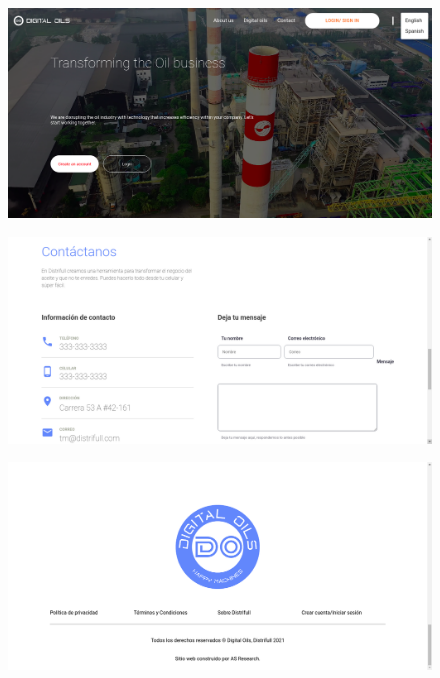 \begin{figure}[!]
	\centering
	\includegraphics[width=1\linewidth, height=0.4\textheight]{imagenes/inicioOneIngles}
	\caption[Primera parte del inicio.]{}
	\label{fig:iniciooneingles}
\end{figure}


\begin{figure}[!]
	\centering
	\includegraphics[width=1\linewidth, height=0.4\textheight]{imagenes/inicioFour}
	\caption[Cuarta parte del inicio.]{}
	\label{fig:inicioFour}
\end{figure}

\begin{figure}[!]
	\centering
	\includegraphics[width=1\linewidth, height=0.4\textheight]{imagenes/inicioFive}
	\caption[Quinta parte del inicio.]{}
	\label{fig:inicioFive}
\end{figure}

